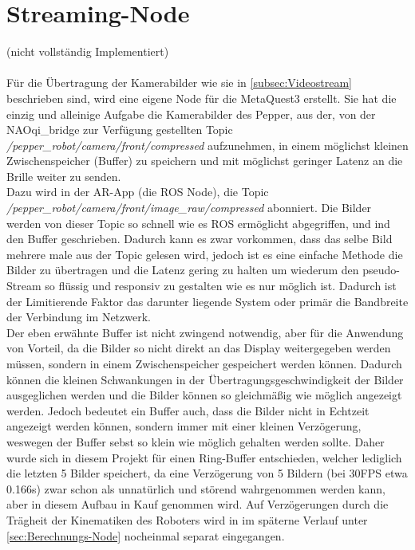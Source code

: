 \section{Streaming-Node}\label{sec:Streaming-Node}
(nicht vollständig Implementiert)\\\\
Für die Übertragung der Kamerabilder wie sie in \autoref{subsec:Videostream} beschrieben sind, wird eine eigene Node für die MetaQuest3 erstellt. Sie hat die einzig und alleinige Aufgabe die Kamerabilder des Pepper, aus der, von der NAOqi\_bridge zur Verfügung gestellten Topic \\ \textit{/pepper\_robot/camera/front/compressed} aufzunehmen, in einem möglichst kleinen Zwischenspeicher (Buffer) zu speichern und mit möglichst geringer Latenz an die Brille weiter zu senden.\\
Dazu wird in der \ac{AR}-App (die \ac{ROS} Node), die Topic \textit{/pepper\_robot/camera/front/image\_raw/compressed} abonniert. Die Bilder werden von dieser Topic so schnell wie es \ac{ROS} ermöglicht abgegriffen, und ind den Buffer geschrieben. Dadurch kann es zwar vorkommen, dass das selbe Bild mehrere male aus der Topic gelesen wird, jedoch ist es eine einfache Methode die Bilder zu übertragen und die Latenz gering zu halten um wiederum den pseudo-Stream so flüssig und responsiv zu gestalten wie es nur möglich ist. Dadurch ist der Limitierende Faktor das darunter liegende System oder primär die Bandbreite der Verbindung im Netzwerk.\\
Der eben erwähnte Buffer ist nicht zwingend notwendig, aber für die Anwendung von Vorteil, da die Bilder so nicht direkt an das Display weitergegeben werden müssen, sondern in einem Zwischenspeicher gespeichert werden können. Dadurch können die kleinen Schwankungen in der Übertragungsgeschwindigkeit der Bilder ausgeglichen werden und die Bilder können so gleichmäßig wie möglich angezeigt werden. Jedoch bedeutet ein Buffer auch, dass die Bilder nicht in Echtzeit angezeigt werden können, sondern immer mit einer kleinen Verzögerung, weswegen der Buffer sebst so klein wie möglich gehalten werden sollte. Daher wurde sich in diesem Projekt für einen Ring-Buffer entschieden, welcher lediglich die letzten 5 Bilder speichert, da eine Verzögerung von 5 Bildern (bei 30\ac{FPS} etwa 0.166s) zwar schon als unnatürlich und störend wahrgenommen werden kann, aber in diesem Aufbau in Kauf genommen wird. Auf Verzögerungen durch die Trägheit der Kinematiken des Roboters wird in im späterne Verlauf unter \autoref{sec:Berechnungs-Node} nocheinmal separat eingegangen.\\
